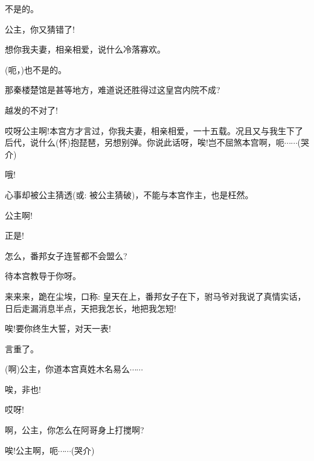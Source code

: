 {不是的。

公主，你又猜错了!

想你我夫妻，相亲相爱，说什么冷落寡欢。

(呃，)也不是的。

那秦楼楚馆是甚等地方，难道说还胜得过这皇宫内院不成?

越发的不对了!

哎呀公主啊!本宫方才言过，你我夫妻，相亲相爱，一十五载。况且又与我生下了后代，说什么(怀)抱琵琶，另想别弹。你说此话呀，唉!岂不屈煞本宫啊，呃$\cdots{}\cdots{}$(哭介)

哦!



心事却被公主猜透({\akai 或}: 被公主猜破)，不能与本宫作主，也是枉然。

公主啊!


正是!

怎么，番邦女子连誓都不会盟么?

待本宫教导于你呀。

来来来，跪在尘埃，口称: 皇天在上，番邦女子在下，驸马爷对我说了真情实话，日后走漏消息半点，天把我怎长，地把我怎短!

唉!要你终生大誓，对天一表!

言重了。



(啊)公主，你道本宫真姓木名易么$\cdots{}\cdots{}$

唉，非也!

哎呀!


啊，公主，你怎么在阿哥身上打搅啊?

唉!公主啊，呃$\cdots{}\cdots{}$(哭介)


}
